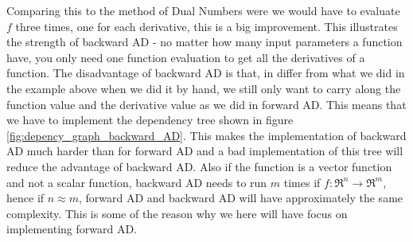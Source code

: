 Comparing this to the method of Dual Numbers were we would have to evaluate $f$ three times, one for each derivative, this is a big improvement. This illustrates the strength of backward AD - no matter how many input parameters a function have, you only need one function evaluation to get all the derivatives of a function. The disadvantage of backward AD is that, in differ from what we did in the example above when we did it by hand, we still only want to carry along the function value and the derivative value as we did in forward AD. This means that we have to implement the dependency tree shown in figure \ref{fig:depency_graph_backward_AD}. This makes the implementation of backward AD much harder than for forward AD and a bad implementation of this tree will reduce the advantage of backward AD. Also if the function is a vector function and not a scalar function, backward AD needs to run $m$ times if $f: \Re^n \rightarrow \Re^m$, hence if $n\approx m$, forward AD and backward AD will have approximately the same complexity. This is some of the reason why we here will have focus on implementing forward AD.

